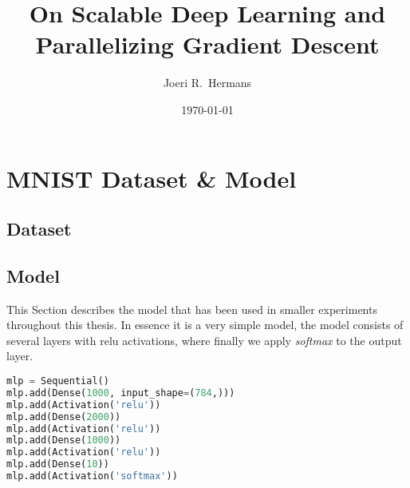\documentclass[10pt, a4paper, oneside]{book}
\title{On Scalable Deep Learning and Parallelizing Gradient Descent}  %
\author{Joeri R.~Hermans}                                             %
\date{\today}                                                         %
\theoremstyle{definition}
\begin{document}


\frontmatter
\let\cleardoublepage\clearpage

%


\tableofcontents
\printnomenclature[3cm]

\mainmatter







\clearpage
\printbibliography

\appendix
\appendixpage

\chapter{MNIST Dataset \& Model}

\section{Dataset}
\label{appendix:mnist_dataset}

\section{Model}
\label{appendix:mnist_model}

This Section describes the model that has been used in smaller experiments throughout this thesis. In essence it is a very simple model, the model consists of several layers with relu activations, where finally we apply \emph{softmax} to the output layer.

\begin{lstlisting}[language=Python]
mlp = Sequential()
mlp.add(Dense(1000, input_shape=(784,)))
mlp.add(Activation('relu'))
mlp.add(Dense(2000))
mlp.add(Activation('relu'))
mlp.add(Dense(1000))
mlp.add(Activation('relu'))
mlp.add(Dense(10))
mlp.add(Activation('softmax'))
\end{lstlisting}
\end{document}
